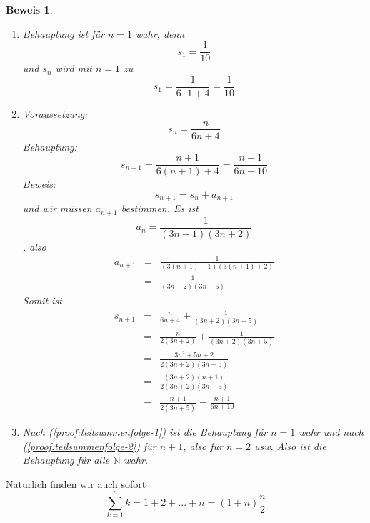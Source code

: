 \documentclass{report}
\newtheorem{myproof}{Beweis}
\begin{document}
\begin{myproof}\begin{enumerate}
\item \label{proof:teilsummenfolge-1} Behauptung ist für $n=1$ wahr, denn
\begin{equation}s_1 = \frac{1}{10}\end{equation}
und $s_n$ wird mit $n=1$ zu
\begin{equation}s_1 = \frac{1}{6 \cdot 1 + 4} = \frac{1}{10}\end{equation}
\item \label{proof:teilsummenfolge-2} Voraussetzung: 
\begin{equation}s_n = \frac{n}{6n+4}\end{equation}
Behauptung:
\begin{equation}s_{n+1} = \frac{n+1}{6(n+1) + 4} = \frac{n+1}{6n+10}\end{equation}
Beweis:
\begin{equation}s_{n+1} = s_n + a_{n+1}\end{equation}
und wir müssen $a_{n+1}$ bestimmen. Es ist
\begin{equation}a_n = \frac{1}{(3n-1)(3n+2)}\end{equation}
, also
\begin{eqnarray}a_{n+1} & = & \frac{1}{(3(n+1)-1)(3(n+1)+2)} \\
& = & \frac{1}{(3n+2)(3n+5)}\end{eqnarray}
Somit ist
\begin{eqnarray}s_{n+1} & = & \frac{n}{6n+4} + \frac{1}{(3n+2)(3n+5)} \\
& = & \frac{n}{2(3n+2)} + \frac{1}{(3n+2)(3n+5)} \\
& = & \frac{3n^2+5n+2}{2(3n+2)(3n+5)} \\
& = & \frac{(3n+2)(n+1)}{2(3n+2)(3n+5)} \\
& = & \frac{n+1}{2(3n+5)} = \frac{n+1}{6n+10}\end{eqnarray}
\item Nach (\ref{proof:teilsummenfolge-1}) ist die Behauptung für $n=1$ wahr und nach (\ref{proof:teilsummenfolge-2}) für $n+1$, also für $n=2$ usw. Also ist die Behauptung für alle $\mathbb{N}$ wahr.
\end{enumerate}\end{myproof}
Natürlich finden wir auch sofort
\begin{equation}\sum_{k=1}^{n} k = 1 + 2 + ... + n = (1+n)\frac{n}{2}\end{equation}
\end{document}
